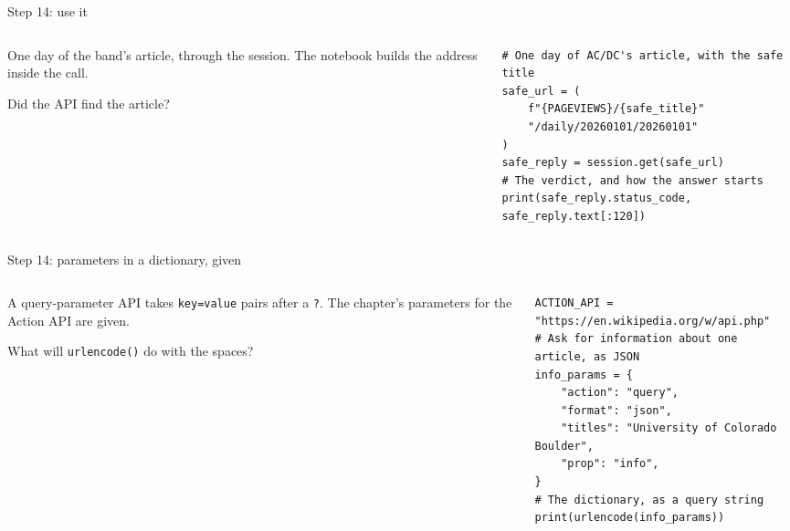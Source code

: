 \documentclass[9pt,aspectratio=169]{beamer}
\begin{document}
\begin{frame}[fragile]{Step 14: use it}
    \begin{columns}[T]
        \begin{column}{0.37\textwidth}
            One day of the band's article, through the session. The notebook builds the address inside the call.

            \medskip
            Did the API find the article?
        \end{column}
        \begin{column}{0.6\textwidth}
\begin{lstlisting}[style=lab]
# One day of AC/DC's article, with the safe title
safe_url = (
    f"{PAGEVIEWS}/{safe_title}"
    "/daily/20260101/20260101"
)
safe_reply = session.get(safe_url)
# The verdict, and how the answer starts
print(safe_reply.status_code, safe_reply.text[:120])
\end{lstlisting}
        \end{column}
    \end{columns}
\end{frame}

\begin{frame}[fragile]{Step 14: parameters in a dictionary, given}
    \begin{columns}[T]
        \begin{column}{0.37\textwidth}
            A query-parameter API takes \texttt{key=value} pairs after a \texttt{?}. The chapter's parameters for the Action API are given.

            \medskip
            What will \texttt{urlencode()} do with the spaces?
        \end{column}
        \begin{column}{0.6\textwidth}
\begin{lstlisting}[style=lab]
ACTION_API = "https://en.wikipedia.org/w/api.php"
# Ask for information about one article, as JSON
info_params = {
    "action": "query",
    "format": "json",
    "titles": "University of Colorado Boulder",
    "prop": "info",
}
# The dictionary, as a query string
print(urlencode(info_params))
\end{lstlisting}
        \end{column}
    \end{columns}
\end{frame}
\end{document}
